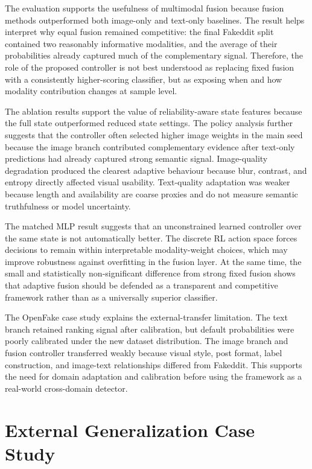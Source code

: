 The evaluation supports the usefulness of multimodal fusion because fusion methods outperformed both image-only and text-only baselines. The result helps interpret why equal fusion remained competitive: the final Fakeddit split contained two reasonably informative modalities, and the average of their probabilities already captured much of the complementary signal. Therefore, the role of the proposed controller is not best understood as replacing fixed fusion with a consistently higher-scoring classifier, but as exposing when and how modality contribution changes at sample level.


The ablation results support the value of reliability-aware state features because the full state outperformed reduced state settings. The policy analysis further suggests that the controller often selected higher image weights in the main seed because the image branch contributed complementary evidence after text-only predictions had already captured strong semantic signal. Image-quality degradation produced the clearest adaptive behaviour because blur, contrast, and entropy directly affected visual usability. Text-quality adaptation was weaker because length and availability are coarse proxies and do not measure semantic truthfulness or model uncertainty.


The matched MLP result suggests that an unconstrained learned controller over the same state is not automatically better. The discrete RL action space forces decisions to remain within interpretable modality-weight choices, which may improve robustness against overfitting in the fusion layer. At the same time, the small and statistically non-significant difference from strong fixed fusion shows that adaptive fusion should be defended as a transparent and competitive framework rather than as a universally superior classifier.


The OpenFake case study explains the external-transfer limitation. The text branch retained ranking signal after calibration, but default probabilities were poorly calibrated under the new dataset distribution. The image branch and fusion controller transferred weakly because visual style, post format, label construction, and image-text relationships differed from Fakeddit. This supports the need for domain adaptation and calibration before using the framework as a real-world cross-domain detector.



\section{External Generalization Case Study}


